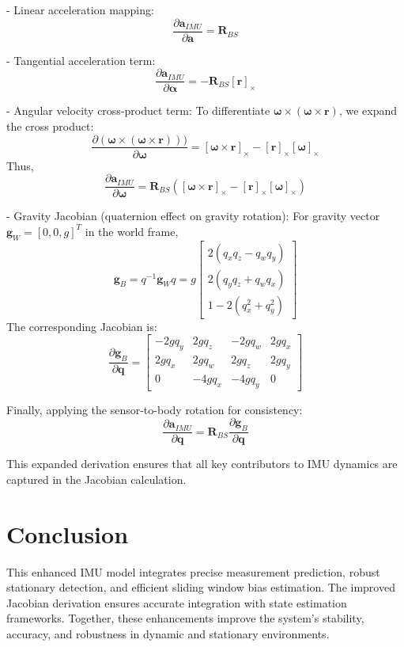 \documentclass{article}
\begin{document}
	- Linear acceleration mapping:
	\[
	\frac{\partial \mathbf{a}_{IMU}}{\partial \mathbf{a}} = \mathbf{R}_{BS}
	\]

	- Tangential acceleration term:
	\[
	\frac{\partial \mathbf{a}_{IMU}}{\partial \boldsymbol{\alpha}} = -\mathbf{R}_{BS} [\mathbf{r}]_\times
	\]

	- Angular velocity cross-product term: To differentiate $\mathbf{\omega} \times (\mathbf{\omega} \times \mathbf{r})$, we expand the cross product:
	\[
	\frac{\partial (\mathbf{\omega} \times (\mathbf{\omega} \times \mathbf{r})))}{\partial \mathbf{\omega}} = [\mathbf{\omega} \times \mathbf{r}]_\times - [\mathbf{r}]_\times [\mathbf{\omega}]_\times
	\]
	Thus,
	\[
	\frac{\partial \mathbf{a}_{IMU}}{\partial \boldsymbol{\omega}} = \mathbf{R}_{BS} \left([\mathbf{\omega} \times \mathbf{r}]_\times - [\mathbf{r}]_\times [\mathbf{\omega}]_\times\right)
	\]

	- Gravity Jacobian (quaternion effect on gravity rotation): For gravity vector $\mathbf{g}_W = [0, 0, g]^T$ in the world frame,
	\[
	\mathbf{g}_B = q^{-1} \mathbf{g}_W q = g \begin{bmatrix}
		2(q_xq_z - q_wq_y) \\
		2(q_yq_z + q_wq_x) \\
		1 - 2(q_x^2 + q_y^2)
	\end{bmatrix}
	\]
	The corresponding Jacobian is:
	\[
	\frac{\partial \mathbf{g}_B}{\partial \mathbf{q}} =
	\begin{bmatrix}
		-2gq_y & 2gq_z & -2gq_w & 2gq_x \\
		2gq_x & 2gq_w & 2gq_z & 2gq_y \\
		0 & -4gq_x & -4gq_y & 0
	\end{bmatrix}
	\]

	Finally, applying the sensor-to-body rotation for consistency:
	\[
	\frac{\partial \mathbf{a}_{IMU}}{\partial \mathbf{q}} = \mathbf{R}_{BS} \frac{\partial \mathbf{g}_B}{\partial \mathbf{q}}
	\]

	This expanded derivation ensures that all key contributors to IMU dynamics are captured in the Jacobian calculation.



	\section*{Conclusion}
	This enhanced IMU model integrates precise measurement prediction, robust stationary detection, and efficient sliding window bias estimation. The improved Jacobian derivation ensures accurate integration with state estimation frameworks. Together, these enhancements improve the system's stability, accuracy, and robustness in dynamic and stationary environments.
	\appendix
\end{document}
